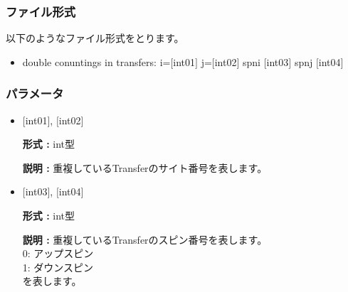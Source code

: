 \subsubsection{ファイル形式}
以下のようなファイル形式をとります。
 \begin{itemize}
   \item  double conuntings in transfers: i=$[$int01$]$ j=$[$int02$]$ spni $[$int03$]$  spnj $[$int04$]$   
 \end{itemize}
 
\subsubsection{パラメータ}
 \begin{itemize}

    \item  $[$int01$]$, $[$int02$]$
   
    {\bf 形式 :} int型

   {\bf 説明 :} 重複しているTransferのサイト番号を表します。
      
         \item  $[$int03$]$, $[$int04$]$  
   
    {\bf 形式 :} int型

   {\bf 説明 :} 重複しているTransferのスピン番号を表します。\\
0: アップスピン\\
1: ダウンスピン\\
を表します。
 
\end{itemize}

\newpage
